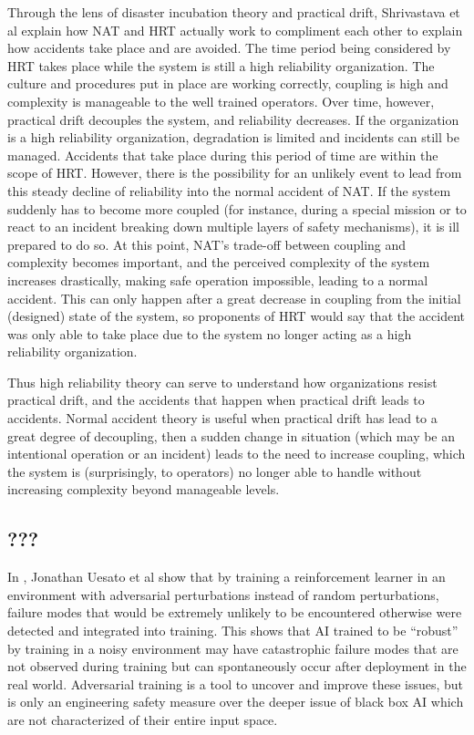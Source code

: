 \documentclass[11pt]{article}
\begin{document}
Through the lens of disaster incubation theory and practical drift, Shrivastava et al explain how
NAT and HRT actually work to compliment each other to explain how accidents take place and are
avoided. The time period being considered by HRT takes place while the system is still a high
reliability organization. The culture and procedures put in place are working correctly, coupling is
high and complexity is manageable to the well trained operators. Over time, however, practical drift
decouples the system, and reliability decreases. If the organization is a high reliability
organization, degradation is limited and incidents can still be managed. Accidents that take place
during this period of time are within the scope of HRT. However, there is the possibility for an
unlikely event to lead from this steady decline of reliability into the normal accident of NAT. If
the system suddenly has to become more coupled (for instance, during a special mission or to react
to an incident breaking down multiple layers of safety mechanisms), it is ill prepared to do so. At
this point, NAT's trade-off between coupling and complexity becomes important, and the perceived
complexity of the system increases drastically, making safe operation impossible, leading to a
normal accident. This can only happen after a great decrease in coupling from the initial (designed)
state of the system, so proponents of HRT would say that the accident was only able to take place
due to the system no longer acting as a high reliability organization. 

Thus high reliability theory can serve to understand how organizations resist practical drift, and
the accidents that happen when practical drift leads to accidents. Normal accident theory is useful
when practical drift has lead to a great degree of decoupling, then a sudden change in situation
(which may be an intentional operation or an incident) leads to the need to increase coupling, which
the system is (surprisingly, to operators) no longer able to handle without increasing complexity
beyond manageable levels. 

\subsection{???}

In \cite{uesato2018adversarial}, Jonathan Uesato et al show that by training a reinforcement learner
in an environment with adversarial perturbations instead of random perturbations, failure modes that
would be extremely unlikely to be encountered otherwise were detected and integrated into training.
This shows that AI trained to be ``robust'' by training in a noisy environment may have catastrophic
failure modes that are not observed during training but can spontaneously occur after deployment in
the real world. Adversarial training is a tool to uncover and improve these issues, but is only an
engineering safety measure over the deeper issue of black box AI which are not characterized of
their entire input space.
\end{document}
